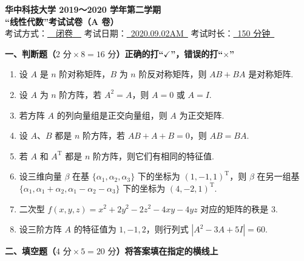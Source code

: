 \documentclass[a4paper,11pt]{ctexart}
\newcommand{\T}{\mathrm{T}}
\begin{document}
\begin{center}
  {\Large\bfseries 华中科技大学 2019～2020 学年第二学期}\\[0.4em]
  {\Large\bfseries “线性代数”考试试卷（A 卷）}\\[1.0em]
  {\normalsize
    考试方式：\underline{\ \ 闭卷\ \ }\quad
    考试日期：\underline{\ 2020.09.02AM\ }\quad
    考试时长：\underline{\ 150 分钟\ }
  }
\end{center}

\vspace{0.8em}

\textbf{一、判断题（$2\text{ 分}\times 8 = 16\text{ 分}$）正确的打“$\checkmark$”，错误的打“$\times$”}

\begin{enumerate}[label={(\quad)\ \arabic*.}, leftmargin=3.8em, itemsep=0.55em, topsep=0.6em]
  \item 设 $A$ 是 $n$ 阶对称矩阵，$B$ 为 $n$ 阶反对称矩阵，则 $AB + BA$ 是对称矩阵.

  \item 设 $A$ 为 $n$ 阶方阵，若 $A^2 = A$，则 $A = 0$ 或 $A = I$.

  \item 若方阵 $A$ 的列向量组是正交向量组，则 $A$ 为正交矩阵.

  \item 设 $A$、$B$ 都是 $n$ 阶方阵，若 $AB + A + B = 0$，则 $AB = BA$.

  \item 若 $A$ 和 $A^{\T}$ 都是 $n$ 阶方阵，则它们有相同的特征值.

  \item 设三维向量 $\beta$ 在基 $\{\alpha_1, \alpha_2, \alpha_3\}$ 下的坐标为 $(1, -1, 1)^{\T}$，则 $\beta$ 在另一组基 $\{\alpha_1, \alpha_1 + \alpha_2, \alpha_1 - \alpha_2 - \alpha_3\}$ 下的坐标为 $(4, -2, 1)^{\T}$.

  \item 二次型 $f(x, y, z) = x^2 + 2y^2 - 2z^2 - 4xy - 4yz$ 对应的矩阵的秩是 $3$.

  \item 设三阶方阵 $A$ 的特征值为 $1, -1, 2$，则行列式 $|A^2 - 3A + 5I| = 60$.
\end{enumerate}

\vspace{1.0em}

\textbf{二、填空题（$4\text{ 分}\times 5 = 20\text{ 分}$）将答案填在指定的横线上}
\end{document}
